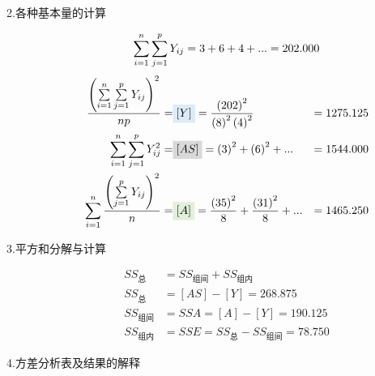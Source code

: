 \begin{description}
\begin{margintable}
{\begin{tabular}{cccccc}
			\bottomrule
		\end{tabular}
	}
\end{margintable}

\item[2.各种基本量的计算]
    \[
        \sum\limits_{i=1}^{n} \sum\limits_{j=1}^{p}Y_{ij} = 3+6+4+...=202.000\\
    \]
    \begin{align*}
            \frac{
                \left(
        	\sum\limits_{i=1}^{n} \sum\limits_{j=1}^{p}Y_{ij}
                \right)^2}
            {np}=& \colorbox[rgb]{ .867,  .922,  .969}{$[Y]$} = 
            \frac{
                \left(
        	    202
                \right)^2}
                {
                    \left(
        	           8
                    \right)^2
                    \left(
                        4
                    \right)^2
                }&=1275.125\\
            \sum\limits_{i=1}^{n} \sum\limits_{j=1}^{p}Y_{ij}^2=
            & \colorbox[rgb]{ .851,  .851,  .851}{$[AS]$} = 
            \left(
            	3
            \right)^2 +
            \left(
            	6
            \right)^2    +... &=1544.000\\
            \sum\limits_{i=1}^{n}
            \frac
                {\left(
	            \sum\limits_{j=1}^{p}Y_{ij}
                \right)^2}
                {n}=
            &\colorbox[rgb]{ .886,  .937,  .855}{$[A]$}=
            \frac{\left(35\right)^2}{8}+\frac{\left(31\right)^2}{8}+...&=1465.250            
    \end{align*}
    
\item[3.平方和分解与计算]
    \begin{align*}
        SS_{\text{总}} & = SS_{\text{组间}}+SS_{\text{组内}}\\
        SS_{\text{总}} & = [AS]-[Y]=268.875\\
        SS_{\text{组间}} & = SSA=[A]-[Y]=190.125\\
        SS_{\text{组内}} & = SSE=SS_{\text{总}}-SS_{\text{组间}}=78.750
    \end{align*}
    
\item[4.方差分析表及结果的解释]


\end{description}
